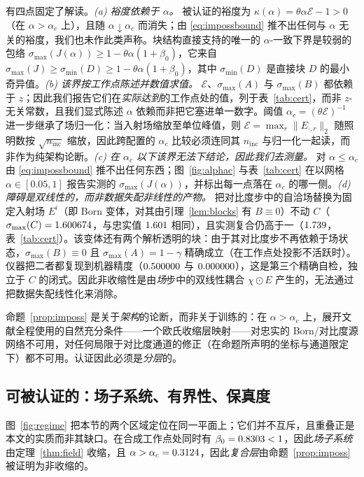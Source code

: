 \documentclass[UTF8,a4paper,11pt]{ctexart}
\newcommand{\numv}[1]{#1}
\begin{document}
有四点固定了解读。\emph{(a) 裕度依赖于 $\alpha$。} 被认证的裕度为 $\kappa(\alpha)=\theta\alpha\mathcal{E}-1>0$（在 $\alpha>\alpha_c$ 上），且随 $\alpha\downarrow\alpha_c$ 而消失；由 \eqref{eq:impossbound} 推不出任何与 $\alpha$ 无关的裕度，我们也未作此类声称。块结构直接支持的唯一的 $\alpha$-一致下界是较弱的包络
$\sigma_{\max}(J(\alpha))\ge1-\theta\alpha(1+\beta_0)$，它来自
$\sigma_{\max}(J)\ge\sigma_{\min}(D)\ge1-\theta\alpha(1+\beta_0)$，其中
$\sigma_{\min}(D)$ 是直接块 $D$ 的最小奇异值。\emph{(b) 该界按工作点陈述并数值求值。} $\mathcal{E}$、$\sigma_{\max}(A)$ 与 $\sigma_{\max}(B)$ 都依赖于 $z$；因此我们报告它们在\emph{实际达到}的工作点处的值，列于表~\ref{tab:cert}，而非 $z$-无关常数，且我们显式陈述 $\alpha$ 依赖而非把它塞进单一数字。阈值 $\alpha_c=(\theta\mathcal{E})^{-1}$ 进一步继承了场归一化：当入射场缩放至单位峰值，则 $\mathcal{E}=\max_r\|E_{\cdot,r}\|_2$ 随照明数按 $\sqrt{n_{\mathrm{inc}}}$ 缩放，因此跨配置的 $\alpha_c$ 比较必须连同其 $n_{\mathrm{inc}}$ 与归一化一起读，而非作为纯架构论断。\emph{(c) 在 $\alpha_c$ 以下该界无法下结论，因此我们去测量。} 对 $\alpha\le\alpha_c$ 由 \eqref{eq:impossbound} 推不出任何东西；图~\ref{fig:alphac} 与表~\ref{tab:cert} 在以网格 $\alpha\in[0.05,1]$ 报告实测的 $\sigma_{\max}(J(\alpha))$，并标出每一点落在 $\alpha_c$ 的哪一侧。\emph{(d) 障碍是双线性的，而非数据失配非线性的产物。} 把对比度步中的自洽场替换为固定入射场 $E^i$（即 Born 变体，对其由引理~\ref{lem:blocks} 有 $B\equiv0$）不动 $C$（$\sigma_{\max}(C)=\numv{\NumBornSigmaC}$，与忠实值 $\numv{\NumSigCLower}$ 相同），且实测复合仍高于一（$\numv{\NumBornSigmaFull}$，表~\ref{tab:cert}）。该变体还有两个解析透明的块：由于其对比度步不再依赖于场状态，$\sigma_{\max}(B)\equiv0$ 且 $\sigma_{\max}(A)=1-\gamma$ 精确成立（在工作点处投影不活跃时）。仪器把二者都复现到机器精度（$\numv{\NumBornSigmaA}$ 与 $\numv{\NumBornSigmaB}$），这是第三个精确自检，独立于 $C$ 的闭式。因此非收缩性是由\emph{场}步中的双线性耦合 $\chi\odot E$ 产生的，无法通过把数据失配线性化来消除。

命题~\ref{prop:imposs} 是关于\emph{架构}的论断，而非关于训练的：在 $\alpha>\alpha_c$ 上，展开文献全程使用的自然充分条件——一个欧氏收缩层映射——对忠实的 Born/对比度源网络不可用，对任何局限于对比度通道的修正（在命题所声明的坐标与通道限定下）都不可用。认证因此必须是\emph{分层}的。

\subsection{可被认证的：场子系统、有界性、保真度}
图~\ref{fig:regime} 把本节的两个区域定位在同一平面上；它们并不互斥，且重叠正是本文的实质而非其缺口。在合成工作点处同时有 $\beta_0=\numv{\betacert}<1$，因此\emph{场子系统}由定理~\ref{thm:field} 收缩，且 $\alpha>\alpha_c=\numv{\NumAlphaC}$，因此\emph{复合层}由命题~\ref{prop:imposs} 被证明为非收缩的。
\end{document}
